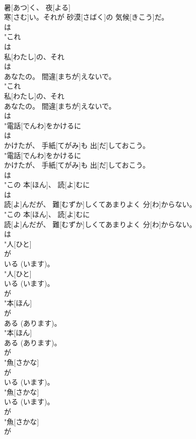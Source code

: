 \documentclass[8pt]{extreport}
\begin{document}
\begin{CJK}{UTF8}{min}
\\	暑[あつ]く、 夜[よる]
\\	寒[さむ]い。それが 砂漠[さばく]の 気候[きこう]だ。
\\	は
\\	"これ
\\	は
\\	私[わたし]の、それ
\\	は
\\	あなたの。 間違[まちが]えないで。
\\	"これ
\\	私[わたし]の、それ
\\	あなたの。 間違[まちが]えないで。
\\	は
\\	"電話[でんわ]をかけるに
\\	は
\\	かけたが、 手紙[てがみ]も 出[だ]しておこう。
\\	"電話[でんわ]をかけるに
\\	かけたが、 手紙[てがみ]も 出[だ]しておこう。
\\	は
\\	"この 本[ほん]、 読[よ]むに
\\	は
\\	読[よ]んだが、 難[むずか]しくてあまりよく 分[わ]からない。
\\	"この 本[ほん]、 読[よ]むに
\\	読[よ]んだが、 難[むずか]しくてあまりよく 分[わ]からない。
\\	は
\\	"人[ひと]
\\	が
\\	いる (います)。
\\	"人[ひと]
\\	いる (います)。
\\	が
\\	"本[ほん]
\\	が
\\	ある (あります)。
\\	"本[ほん]
\\	ある (あります)。
\\	が
\\	"魚[さかな]
\\	が
\\	いる (います)。
\\	"魚[さかな]
\\	いる (います)。
\\	が
\\	"魚[さかな]
\\	が

\end{CJK}
\end{document}
